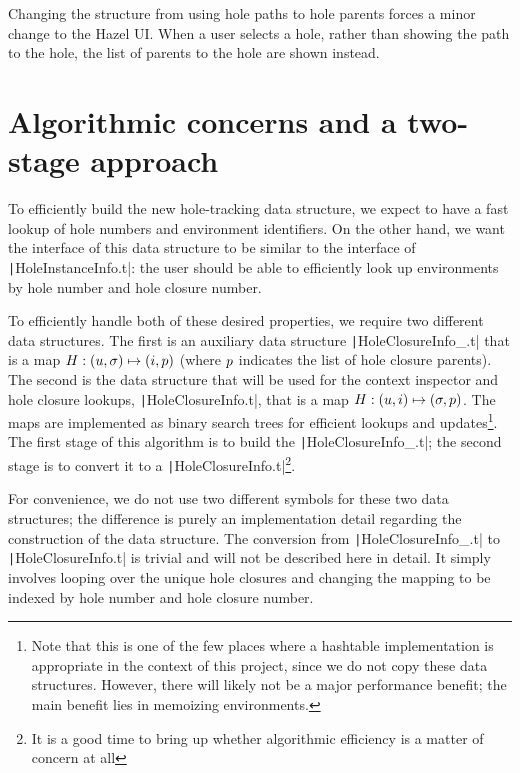Changing the structure from using hole paths to hole parents forces a minor change to the Hazel UI. When a user selects a hole, rather than showing the path to the hole, the list of parents to the hole are shown instead.

\section{Algorithmic concerns and a two-stage approach}
\label{sec:two-stage-renumber}

To efficiently build the new hole-tracking data structure, we expect to have a fast lookup of hole numbers and environment identifiers. On the other hand, we want the interface of this data structure to be similar to the interface of \texttt|HoleInstanceInfo.t|: the user should be able to efficiently look up environments by hole number and hole closure number.

To efficiently handle both of these desired properties, we require two different data structures. The first is an auxiliary data structure \texttt|HoleClosureInfo_.t| that is a map $H:(u,\sigma)\mapsto(i,p)$ (where $p$ indicates the list of hole closure parents). The second is the data structure that will be used for the context inspector and hole closure lookups, \texttt|HoleClosureInfo.t|, that is a map $H:(u,i)\mapsto(\sigma,p)$. The maps are implemented as binary search trees for efficient lookups and updates\footnote{Note that this is one of the few places where a hashtable implementation is appropriate in the context of this project, since we do not copy these data structures. However, there will likely not be a major performance benefit; the main benefit lies in memoizing environments.}. The first stage of this algorithm is to build the \texttt|HoleClosureInfo_.t|; the second stage is to convert it to a \texttt|HoleClosureInfo.t|\footnote{It is a good time to bring up whether algorithmic efficiency is a matter of concern at all }.

For convenience, we do not use two different symbols for these two data structures; the difference is purely an implementation detail regarding the construction of the data structure. The conversion from \texttt|HoleClosureInfo_.t| to \texttt|HoleClosureInfo.t| is trivial and will not be described here in detail. It simply involves looping over the unique hole closures and changing the mapping to be indexed by hole number and hole closure number.

